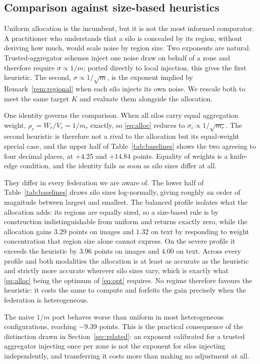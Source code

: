 \documentclass[acmsmall,screen,review,anonymous]{acmart}
\theoremstyle{acmdefinition}%
\begin{document}
\subsection{Comparison against size-based heuristics}

Uniform allocation is the incumbent, but it is not the most informed comparator. A
practitioner who understands that a silo is concealed by its region, without
deriving how much, would scale noise by region size. Two exponents are natural.
Trusted-aggregator schemes inject one noise draw on behalf of a zone and therefore
require $\sigma \propto 1/m$; ported directly to local injection, this gives the
first heuristic. The second, $\sigma \propto 1/\sqrt{m}$, is the exponent implied
by Remark~\ref{rem:regional} when each silo injects its own noise. We rescale both
to meet the same target $K$ and evaluate them alongside the allocation.

One identity governs the comparison. When all silos carry equal aggregation
weight, $\rho_r = W_r/V_r = 1/m_r$ exactly, so \eqref{eq:alloc} reduces to
$\sigma_i \propto 1/\sqrt{m_r}$. The second heuristic is therefore not a rival to
the allocation but its equal-weight special case, and the upper half of
Table~\ref{tab:baselines} shows the two agreeing to four decimal places, at
$+4.25$ and $+14.84$ points. Equality of weights is a knife-edge condition, and
the identity fails as soon as silo sizes differ at all.

They differ in every federation we are aware of. The lower half of
Table~\ref{tab:baselines} draws silo sizes log-normally, giving roughly an order of
magnitude between largest and smallest. The balanced profile isolates what the
allocation adds: its regions are equally sized, so a size-based rule is by
construction indistinguishable from uniform and returns exactly zero, while the
allocation gains $3.29$ points on images and $1.32$ on text by responding to
weight concentration that region size alone cannot express. On the severe profile
it exceeds the heuristic by $3.96$ points on images and $4.00$ on text. Across
every profile and both modalities the allocation is at least as accurate as the
heuristic and strictly more accurate wherever silo sizes vary, which is exactly
what \eqref{eq:alloc} being the optimum of \eqref{eq:opt} requires. No regime
therefore favours the heuristic: it costs the same to compute and forfeits the
gain precisely when the federation is heterogeneous.

The naive $1/m$ port behaves worse than uniform in most heterogeneous
configurations, reaching $-9.39$ points. This is the practical consequence of the
distinction drawn in Section~\ref{sec:related}: an exponent calibrated for a
trusted aggregator injecting once per zone is not the exponent for silos injecting
independently, and transferring it costs more than making no adjustment at all.
\end{document}
